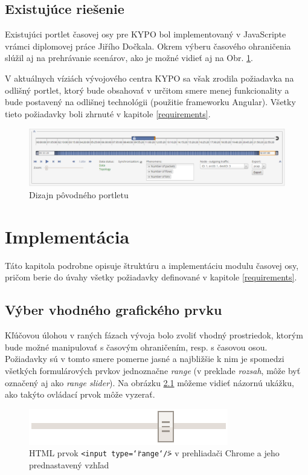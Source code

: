 \documentclass[
  digital, %
  twoside, %
  notable,   %
  nolof,   %
  nolot,   %
]{fithesis3}
\begin{document}
\section{Existujúce riešenie}
Existujúci portlet časovej osy pre KYPO bol implementovaný v JavaScripte vrámci diplomovej práce Jiřího Dočkala\cite{dockal2016webovy}. Okrem výberu časového ohraničenia slúžil aj na prehrávanie scenárov, ako je možné vidieť aj na Obr. \ref{old_portlet}.

V aktuálnych víziách vývojového centra KYPO sa však zrodila požiadavka na odlišný portlet, ktorý bude obsahovať v určitom smere menej funkcionality a bude postavený na odlišnej technológii (použitie frameworku Angular). Všetky tieto požiadavky boli zhrnuté v kapitole \ref{requirements}.
\begin{figure}[H]
	\center
	\includegraphics[width=1.0\linewidth]{old_portlet}
	\caption{Dizajn pôvodného portletu\cite{dockal2016webovy}}
	\label{old_portlet}
\end{figure}

\chapter{Implementácia}
Táto kapitola podrobne opisuje štruktúru a implementáciu modulu časovej osy, pričom berie do úvahy všetky požiadavky definované v kapitole \ref{requirements}.

\section{Výber vhodného grafického prvku}
Kľúčovou úlohou v raných fázach vývoja bolo zvoliť vhodný prostriedok, ktorým bude možné manipulovať s časovým ohraničením, resp. s časovou osou. Požiadavky sú v tomto smere pomerne jasné a najbližšie k nim je spomedzi všetkých formulárových prvkov jednoznačne \textit{range} (v preklade \textit{rozsah}, môže byť označený aj ako \textit{range slider}). Na obrázku \ref{html_range} môžeme vidieť názornú ukážku, ako takýto ovládací prvok môže vyzerať.
\begin{figure}[H]
	\center
	\includegraphics{html_range}
	\caption{HTML prvok \texttt{<input type=\char`\"range\char`\"/>} v prehliadači Chrome a jeho prednastavený vzhľad}
	\label{html_range}
\end{figure}
\end{document}
